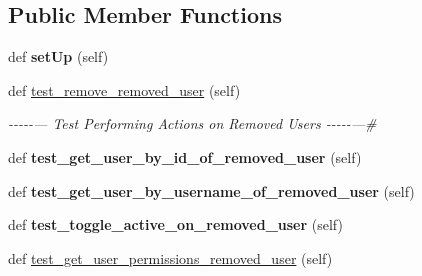 \subsection*{Public Member Functions}
\begin{DoxyCompactItemize}
\item 
\mbox{\label{classtests_1_1test__13__actions__on__removed__user_1_1_test_user_routes_a0452644bd32ddb13fd0a2cc1840ab5d0}} 
def {\bfseries set\+Up} (self)
\item 
\mbox{\label{classtests_1_1test__13__actions__on__removed__user_1_1_test_user_routes_a541d374f819e00df9fe83d205b50a37e}} 
def \hyperlink{classtests_1_1test__13__actions__on__removed__user_1_1_test_user_routes_a541d374f819e00df9fe83d205b50a37e}{test\+\_\+remove\+\_\+removed\+\_\+user} (self)
\begin{DoxyCompactList}\small\item\em -\/-\/-\/-\/-\/--- Test Performing Actions on Removed Users -\/-\/-\/-\/-\/---\# \end{DoxyCompactList}\item 
\mbox{\label{classtests_1_1test__13__actions__on__removed__user_1_1_test_user_routes_ab9e4aee139ec8ad6146daca42332b062}} 
def {\bfseries test\+\_\+get\+\_\+user\+\_\+by\+\_\+id\+\_\+of\+\_\+removed\+\_\+user} (self)
\item 
\mbox{\label{classtests_1_1test__13__actions__on__removed__user_1_1_test_user_routes_afc8631ce10ede4b6ff2120d03662fd89}} 
def {\bfseries test\+\_\+get\+\_\+user\+\_\+by\+\_\+username\+\_\+of\+\_\+removed\+\_\+user} (self)
\item 
\mbox{\label{classtests_1_1test__13__actions__on__removed__user_1_1_test_user_routes_a1beb450a43bb0e60bf70296789eb0dbe}} 
def {\bfseries test\+\_\+toggle\+\_\+active\+\_\+on\+\_\+removed\+\_\+user} (self)
\item 
def \hyperlink{classtests_1_1test__13__actions__on__removed__user_1_1_test_user_routes_a2154e49765948b25aa6e264e8238eed2}{test\+\_\+get\+\_\+user\+\_\+permissions\+\_\+removed\+\_\+user} (self)

\end{DoxyCompactItemize}
